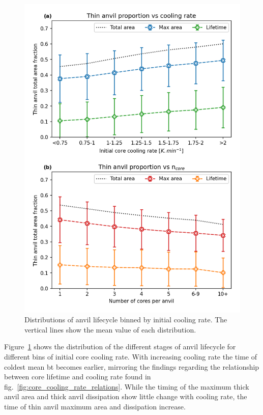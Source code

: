 \begin{figure}[tp]
    \centering
    \includegraphics[width=\textwidth]{figures/chapter3_06.png}
    \caption[
    Distributions of anvil lifecycle binned by initial cooling rate
    ]{
    Distributions of anvil lifecycle binned by initial cooling rate. The vertical lines show the mean value of each distribution.
    }
    \label{fig:anvil_cooling_rate_lifecycle}
\end{figure}

Figure~\ref{fig:anvil_cooling_rate_lifecycle} shows the distribution of the different stages of anvil lifecycle for different bins of initial core cooling rate.
With increasing cooling rate the time of coldest mean \acrshort{bt} becomes earlier, mirroring the findings regarding the relationship between core lifetime and cooling rate found in fig.~\ref{fig:core_cooling_rate_relations}.
While the timing of the maximum thick anvil area and thick anvil dissipation show little change with cooling rate, the time of thin anvil maximum area and dissipation increase.


